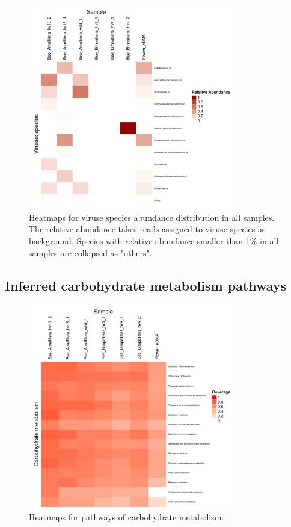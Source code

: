 \documentclass[11pt]{article}
\begin{document}
  \begin{figure}[H]
    \centering
    \includegraphics[width=0.8\textwidth]{../Figures/RelativeAbundance_0_01_species_Viruses.pdf}
    \caption{Heatmaps for viruse species abundance distribution in all samples. 
    The relative abundance takes reads assigned to viruse species as background. 
    Species with relative abundance smaller than 1\% in all samples are collapsed as "others".}
    \label{ViruseHeatmap}
    \end{figure}
  
  \subsection{Inferred carbohydrate metabolism pathways}
  \begin{figure}[H]
    \centering
    \includegraphics[width=0.8\textwidth]{../Figures/PathwayCov_Carbonhydrate.pdf}
    \caption{Heatmaps for pathways of carbohydrate metabolism.}
    \label{Carbohydrate}
    \end{figure}

  \newpage
  
  
\end{document}
